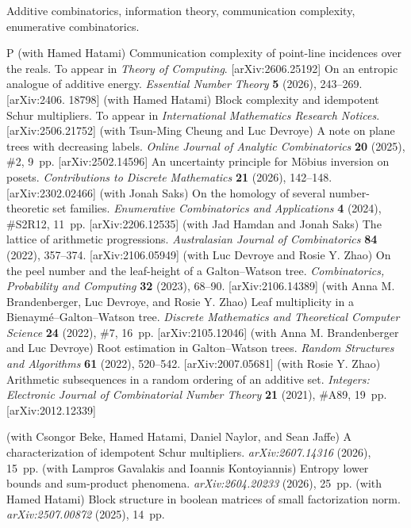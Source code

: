 
Additive combinatorics, information theory, communication complexity, enumerative combinatorics.


\begingroup\frenchspacing
{}
\ppubbegin P
\papitem (with Hamed Hatami)
Communication complexity of point-line incidences over the reals.
To appear in {\sl Theory of Computing}.
[arXiv:2606.25192]
\papitem On an entropic analogue of additive energy.
{\sl Essential Number Theory}\/ {\bf 5} (2026), 243--269.
[arXiv:2406. 18798]
\papitem (with Hamed Hatami)
Block complexity and idempotent Schur multipliers.
To appear in {\sl International Mathematics Research Notices}.
[arXiv:2506.21752]
\papitem (with Tsun-Ming Cheung and Luc Devroye)
A note on plane trees with decreasing labels.
{\sl Online Journal of Analytic Combinatorics}\/ {\bf 20} (2025), \#2, 9~pp.
[arXiv:2502.14596]
\papitem An uncertainty principle for M\"obius inversion on posets.
{\sl Contributions to Discrete Mathematics}\/ {\bf 21} (2026), 142--148.
[arXiv:2302.02466]
\papitem (with Jonah Saks)
On the homology of several number-theoretic set families.
{\sl Enumerative Combinatorics and Applications}\/ {\bf 4} (2024), \#S2R12, 11~pp.
[arXiv:2206.12535]
\papitem (with Jad Hamdan and Jonah Saks)
The lattice of arithmetic progressions.
{\sl Australasian Journal of Combinatorics}\/ {\bf 84} (2022), 357--374.
[arXiv:2106.05949]
\papitem (with Luc Devroye and Rosie Y. Zhao)
On the peel number and the leaf-height of a Galton--Watson tree.
{\sl Combinatorics, Probability and Computing}\/ {\bf 32} (2023), 68--90.
[arXiv:2106.14389]
\papitem (with Anna M. Brandenberger, Luc Devroye, and Rosie Y. Zhao)
Leaf multiplicity in a Bienaym\'e--Galton--Watson tree. {\sl Discrete Mathematics
and Theoretical Computer Science}\/ {\bf 24} (2022), \#7, 16~pp.
[arXiv:2105.12046]
\papitem (with Anna M. Brandenberger and Luc Devroye)
Root estimation in Galton--Watson trees. {\sl Random Structures and Algorithms}\/ {\bf 61} (2022), 520--542.
[arXiv:2007.05681]
\papitem (with Rosie Y. Zhao)
Arithmetic subsequences in a random ordering of an additive set.
{\sl Integers: Electronic Journal of Combinatorial Number Theory}\/ {\bf 21} (2021), \#A89, 19~pp.
[arXiv:2012.12339]


\begingroup\frenchspacing\parindent=10pt
\thing (with Csongor Beke, Hamed Hatami, Daniel Naylor, and Sean Jaffe)
A characterization of idempotent Schur multipliers.
{\sl arXiv:2607.14316} (2026), 15~pp.
\smallskip
\thing (with Lampros Gavalakis and Ioannis Kontoyiannis)
Entropy lower bounds and sum-product phenomena.
{\sl arXiv:2604.20233} (2026), 25~pp.
\smallskip
\thing (with Hamed Hatami)
Block structure in boolean matrices of small factorization norm.
{\sl arXiv:2507.00872} (2025), 14~pp.
\smallskip
\endgroup


